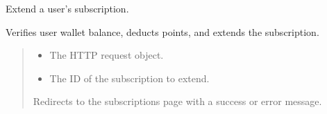 \documentclass[letterpaper,10pt,english]{sphinxmanual}
\begin{document}

\begin{fulllineitems}
\label{\detokenize{modules/views:client.views.extend_subscription}}
\pysigstartsignatures
{}
\pysigstopsignatures
\sphinxAtStartPar
Extend a user’s subscription.

\sphinxAtStartPar
Verifies user wallet balance, deducts points, and extends the subscription.
\begin{quote}\begin{description}
\begin{itemize}
\item {} 
\sphinxAtStartPar
{} \textendash{} The HTTP request object.

\item {} 
\sphinxAtStartPar
{} \textendash{} The ID of the subscription to extend.

\end{itemize}

\sphinxAtStartPar
Redirects to the subscriptions page with a success or error message.

\end{description}\end{quote}

\end{fulllineitems}

\end{document}
